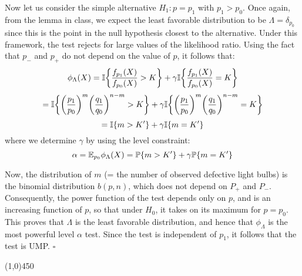 \documentclass[12pt]{article}
\begin{document}
\noindent
Now let us consider the simple alternative $H_1: p = p_1$ with $p_1 > p_0$. Once again, from the lemma in class, we expect the least favorable distribution to be $\Lambda = \delta_{p_0}$ since this is the point in the null hypothesis closest to the alternative. Under this framework, the test rejects for large values of the likelihood ratio. Using the fact that $p_-$ and $p_+$ do not depend on the value of $p$, it follows that:
$$\phi_\Lambda(X) = \mathbb{I} \biggl\{ \frac{f_{p_1}(X)}{f_{p_0}(X)} > K\biggr\} + \gamma\mathbb{I} \biggl\{ \frac{f_{p_1}(X)}{f_{p_0}(X)} = K\biggr\}$$
$$= \mathbb{I} \biggl\{  \biggl(\frac{p_1}{p_0} \biggl)^m \biggl( \frac{q_1}{q_0} \bigg)^{n-m} > K \biggr\}
+ \gamma \mathbb{I} \biggl\{  \biggl(\frac{p_1}{p_0} \biggl)^m \biggl( \frac{q_1}{q_0} \bigg)^{n-m} = K \biggr\}$$
$$= \mathbb{I} \{ m > K' \} + \gamma \mathbb{I}\{ m = K' \}$$
where we determine $\gamma$ by using the level constraint:
$$\alpha = \mathbb{E}_{p_0} \phi_\Lambda(X) = \mathbb{P} \{m>K'\} + \gamma \mathbb{P}\{ m = K'\}$$

\noindent
Now, the distribution of $m$ (= the number of observed defective light bulbs) is the binomial distribution $b(p,n)$, which does not depend on $P_+$ and $P_-$. Consequently, the power function of the test depends only on $p$, and is an increasing function of $p$, so that under $H_0$, it takes on its maximum for $p=p_0$. This proves that $\Lambda$ is the least favorable distribution, and hence that $\phi_\Lambda$ is the most powerful level $\alpha$ test. Since the test is independent of $p_1$, it follows that the test is UMP. $\square$

\begin{center}
\line(1,0){450}
\end{center}
\end{document}

